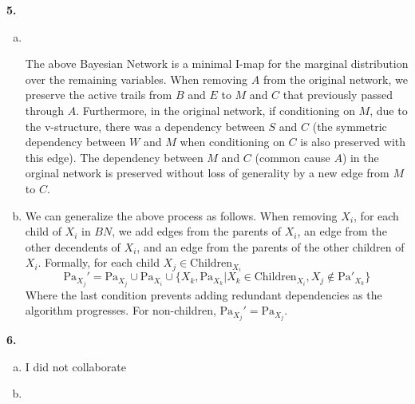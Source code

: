 \documentclass{article}
\begin{document}
\textbf{5.} \begin{enumerate}[(a)]
    \item \textcolor{white}{{s}}\begin{center}
    \end{center}
    The above Bayesian Network is a minimal I-map for the marginal distribution over the remaining variables. When removing $A$ from the original network, we preserve the active trails from $B$ and $E$ to $M$ and $C$ that previously passed through $A$. Furthermore, in the original network, if conditioning on $M$, due to the v-structure, there was a dependency between $S$ and $C$ (the symmetric dependency between $W$ and $M$ when conditioning on $C$ is also preserved with this edge). The dependency between $M$ and $C$ (common cause $A$) in the orginal network is preserved without loss of generality by a new edge from $M$ to $C$. 
    \item We can generalize the above process as follows. When removing $X_i$, for each child of $X_i$ in $BN$, we add edges from the parents of $X_i$, an edge from the other decendents of $X_i$, and an edge from the parents of the other children of $X_i$. Formally, for each child $X_j \in \text{Children}_{X_i}$ \begin{equation*}
        \text{Pa}_{X_j}' = \text{Pa}_{X_j} \cup \text{Pa}_{X_i} \cup \{X_k, \text{Pa}_{X_k} | X_k \in \text{Children}_{X_i}, X_j \notin \text{Pa}'_{X_k}\}
    \end{equation*}
    Where the last condition prevents adding redundant dependencies as the algorithm progresses. For non-children, $\text{Pa}_{X_j}' = \text{Pa}_{X_j}$. 
\end{enumerate}
\textbf{6.} \begin{enumerate}[(a)]
    \item I did not collaborate 
    \item 
\end{enumerate}
\end{document}
